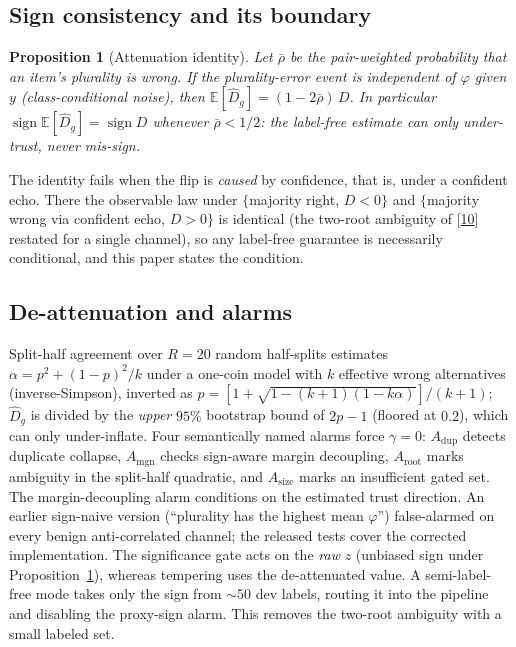 \documentclass[conference]{IEEEtran}
\newtheorem{proposition}{Proposition}
\newcommand{\Dhat}{\widehat{D}}
\newcommand{\sign}{\operatorname{sign}}
\begin{document}
\subsection{Sign consistency and its boundary}
\begin{proposition}[Attenuation identity]\label{prop:ccn}
Let $\bar\rho$ be the pair-weighted probability that an item's plurality is wrong. If the plurality-error event is independent of $\varphi$ given $y$ (class-conditional noise), then
$\mathbb{E}[\Dhat_g]=(1-2\bar\rho)\,D$.
In particular $\sign\mathbb{E}[\Dhat_g]=\sign D$ whenever $\bar\rho<1/2$: the label-free estimate can only under-trust, never mis-sign.
\end{proposition}
The identity fails when the flip is \emph{caused} by confidence, that is, under a confident echo. There the observable law under $\{$majority right, $D<0\}$ and $\{$majority wrong via confident echo, $D>0\}$ is identical (the two-root ambiguity of [\hyperlink{bib:parisi2014ranking}{10}] restated for a single channel), so any label-free guarantee is necessarily conditional, and this paper states the condition.

\subsection{De-attenuation and alarms}
Split-half agreement over $R{=}20$ random half-splits estimates $\alpha=p^2+(1-p)^2/k$ under a one-coin model with $k$ effective wrong alternatives (inverse-Simpson), inverted as $p=[1+\sqrt{1-(k{+}1)(1-k\alpha)}]/(k{+}1)$; $\Dhat_g$ is divided by the \emph{upper} $95\%$ bootstrap bound of $2p-1$ (floored at $0.2$), which can only under-inflate. Four semantically named alarms force $\gamma=0$: $A_{\mathrm{dup}}$ detects duplicate collapse, $A_{\mathrm{mgn}}$ checks sign-aware margin decoupling, $A_{\mathrm{root}}$ marks ambiguity in the split-half quadratic, and $A_{\mathrm{size}}$ marks an insufficient gated set. The margin-decoupling alarm conditions on the estimated trust direction. An earlier sign-naive version (``plurality has the highest mean $\varphi$'') false-alarmed on every benign anti-correlated channel; the released tests cover the corrected implementation. The significance gate acts on the \emph{raw} $z$ (unbiased sign under Proposition~\ref{prop:ccn}), whereas tempering uses the de-attenuated value. A semi-label-free mode takes only the sign from ${\sim}50$ dev labels, routing it into the pipeline and disabling the proxy-sign alarm. This removes the two-root ambiguity with a small labeled set.
\end{document}

